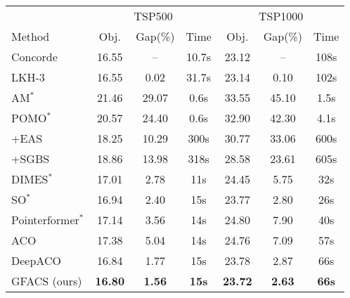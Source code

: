 \documentclass{article}
\begin{document}

\begin{table}[H]
\centering
\footnotesize
\setlength{\tabcolsep}{2pt}
\renewcommand{\arraystretch}{1.2}

\noindent
\begin{minipage}[t]{0.495\textwidth}
\vspace*{0pt}
\centering
\begin{tabular}{l ccc ccc}
\toprule[1pt]
& \multicolumn{3}{c}{TSP500} & \multicolumn{3}{c}{TSP1000}\\
\cmidrule(lr){2-4}\cmidrule(lr){5-7}
Method & Obj. & Gap(\%) & Time & Obj. & Gap(\%) & Time \\
\midrule[1pt]
Concorde           & 16.55 & --    & 10.7s & 23.12 & --   & 108s \\
LKH-3              & 16.55 & 0.02  & 31.7s & 23.14 & 0.10 & 102s \\
\cmidrule(lr){1-1}\cmidrule(lr){2-4}\cmidrule(lr){5-7}
AM$^*$             & 21.46 & 29.07 & 0.6s & 33.55 & 45.10 & 1.5s \\
POMO$^*$           & 20.57 & 24.40 & 0.6s & 32.90 & 42.30 & 4.1s \\
\quad +EAS         & 18.25 & 10.29 & 300s & 30.77 & 33.06 & 600s \\
\quad +SGBS        & 18.86 & 13.98 & 318s & 28.58 & 23.61 & 605s \\
DIMES$^*$          & 17.01 & 2.78  & 11s  & 24.45 & 5.75  & 32s \\
SO$^*$             & 16.94 & 2.40  & 15s  & 23.77 & 2.80  & 26s \\
Pointerformer$^*$  & 17.14 & 3.56  & 14s  & 24.80 & 7.90  & 40s \\
\cmidrule(lr){1-1}\cmidrule(lr){2-4}\cmidrule(lr){5-7}
ACO                & 17.38 & 5.04 & 14s & 24.76 & 7.09 & 57s \\
DeepACO            & 16.84 & 1.77 & 15s & 23.78 & 2.87 & 66s \\
GFACS (ours) & \textbf{16.80} & \textbf{1.56} & \textbf{15s} &
\textbf{23.72} & \textbf{2.63} & \textbf{66s} \\
\bottomrule[1pt]
\end{tabular}
\end{minipage}
\hfill
\begin{minipage}[t]{0.495 \textwidth}
\vspace*{0pt}
\centering
\begin{tabular}{l ccc ccc}

\end{tabular}
\end{minipage}
\end{table}
\end{document}

